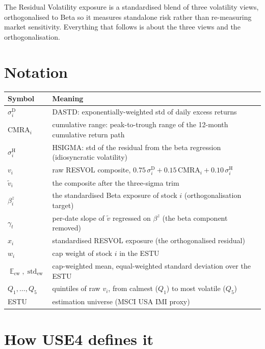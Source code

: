 \documentclass[11pt]{article}
\theoremstyle{definition}
\theoremstyle{plain}
\theoremstyle{remark}
\DeclareMathOperator{\std}{std}
\DeclareMathOperator*{\avg}{\mathbb{E}}
\begin{document}
\begin{keyresult}
The Residual Volatility exposure is a standardised blend of three volatility views, orthogonalised to Beta so it measures standalone risk rather than re-measuring market sensitivity. Everything that follows is about the three views and the orthogonalisation.
\end{keyresult}

\section*{Notation}

\begin{center}
\begin{tabular}{@{}ll@{}}
\toprule
Symbol & Meaning \\
\midrule
$\sigma^{\text{D}}_i$ & DASTD: exponentially-weighted std of daily excess returns \\
$\text{CMRA}_i$ & cumulative range: peak-to-trough range of the 12-month cumulative return path \\
$\sigma^{\text{H}}_i$ & HSIGMA: std of the residual from the beta regression (idiosyncratic volatility) \\
$v_i$ & raw RESVOL composite, $0.75\,\sigma^{\text{D}}_i + 0.15\,\text{CMRA}_i + 0.10\,\sigma^{\text{H}}_i$ \\
$\tilde v_i$ & the composite after the three-sigma trim \\
$\beta^{z}_i$ & the standardised Beta exposure of stock $i$ (orthogonalisation target) \\
$\gamma_t$ & per-date slope of $\tilde v$ regressed on $\beta^{z}$ (the beta component removed) \\
$x_i$ & standardised RESVOL exposure (the orthogonalised residual) \\
$w_i$ & cap weight of stock $i$ in the ESTU \\
$\avg_{\text{cw}}, \std_{\text{ew}}$ & cap-weighted mean, equal-weighted standard deviation over the ESTU \\
$Q_1,\dots,Q_5$ & quintiles of raw $v_i$, from calmest ($Q_1$) to most volatile ($Q_5$) \\
ESTU & estimation universe (MSCI USA IMI proxy) \\
\bottomrule
\end{tabular}
\end{center}

\section{How USE4 defines it}\label{sec:def}
\end{document}
